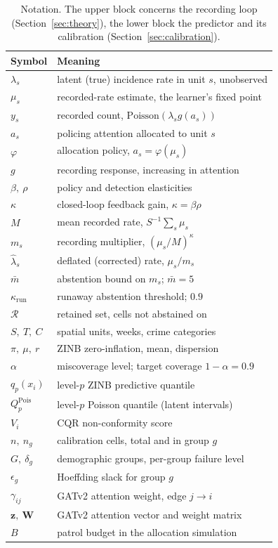 \documentclass[journal,10pt,twocolumn]{IEEEtran}
\begin{document}
\begin{table}[!t]
  \centering
  \caption{Notation. The upper block concerns the recording loop
  (Section~\ref{sec:theory}), the lower block the predictor and its calibration
  (Section~\ref{sec:calibration}).}
  \label{tab:notation}
  \footnotesize
  \begin{tabular}{ll}
    \toprule
    \textbf{Symbol} & \textbf{Meaning} \\
    \midrule
    $\lambda_s$ & latent (true) incidence rate in unit $s$, unobserved \\
    $\mu_s$ & recorded-rate estimate, the learner's fixed point \\
    $y_s$ & recorded count, $\mathrm{Poisson}(\lambda_s g(a_s))$ \\
    $a_s$ & policing attention allocated to unit $s$ \\
    $\varphi$ & allocation policy, $a_s = \varphi(\mu_s)$ \\
    $g$ & recording response, increasing in attention \\
    $\beta,\ \rho$ & policy and detection elasticities \\
    $\kappa$ & closed-loop feedback gain, $\kappa = \beta\rho$ \\
    $M$ & mean recorded rate, $S^{-1}\sum_s \mu_s$ \\
    $m_s$ & recording multiplier, $(\mu_s/M)^{\kappa}$ \\
    $\hat{\lambda}_s$ & deflated (corrected) rate, $\mu_s/m_s$ \\
    $\bar{m}$ & abstention bound on $m_s$; $\bar{m}=5$ \\
    $\kappa_{\mathrm{run}}$ & runaway abstention threshold; $0.9$ \\
    $\mathcal{R}$ & retained set, cells not abstained on \\
    \midrule
    $S,\ T,\ C$ & spatial units, weeks, crime categories \\
    $\pi,\ \mu,\ r$ & ZINB zero-inflation, mean, dispersion \\
    $\alpha$ & miscoverage level; target coverage $1-\alpha = 0.9$ \\
    $q_p(x_i)$ & level-$p$ ZINB predictive quantile \\
    $Q^{\mathrm{Pois}}_p$ & level-$p$ Poisson quantile (latent intervals) \\
    $V_i$ & CQR non-conformity score \\
    $n,\ n_g$ & calibration cells, total and in group $g$ \\
    $G,\ \delta_g$ & demographic groups, per-group failure level \\
    $\epsilon_g$ & Hoeffding slack for group $g$ \\
    $\gamma_{ij}$ & GATv2 attention weight, edge $j \to i$ \\
    $\mathbf{z},\ \mathbf{W}$ & GATv2 attention vector and weight matrix \\
    $B$ & patrol budget in the allocation simulation \\
    \bottomrule
  \end{tabular}
\end{table}
\end{document}
